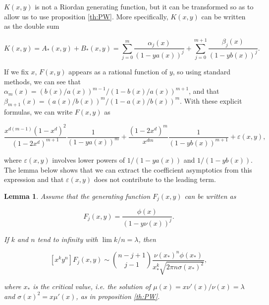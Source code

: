 \documentclass{article}
\newtheorem{lemma}{Lemma}
\begin{document}
$K(x,y)$ is not a Riordan generating function, but it can be transformed
so as to allow us to use proposition \ref{th:PW}. More specifically,
$K(x,y)$ can be written as the double sum

\begin{equation}
\label{eq:mcontigs}
K(x,y) = A_*(x,y) + B_*(x,y) =
\sum_{j=0}^m\frac{\alpha_j(x)}{\left(1-ya(x)\right)^j}
+ \sum_{j=0}^{m+1}\frac{\beta_j(x)}{\left(1-yb(x)\right)^j}.
\end{equation}

If we fix $x$, $F(x,y)$ appears as a rational function of $y$, so using
standard methods, we can see that $\alpha_m(x) = (b(x)/a(x))^{m-1} /
(1-b(x)/a(x))^{m+1}$, and that $\beta_{m+1}(x) = (a(x)/b(x))^m /
(1-a(x)/b(x))^m$. With these explicit formulas, we can write $F(x,y)$ as

\begin{equation}
\label{eq:mcontigs_epsilon}
\frac{x^{d(m-1)}(1-x^d)^2}{(1-2x^d)^{m+1}}
  \frac{1}{\left(1-ya(x)\right)^m} + 
\frac{(1-2x^d)^m}{x^{dm}}
  \frac{1}{\left(1-yb(x)\right)^{m+1}} + \varepsilon(x,y),
\end{equation}

\noindent
where $\varepsilon(x,y)$ involves lower powers of $1 / (1-ya(x))$ and
$1 / (1-yb(x))$. The lemma below shows that we can extract the coefficient
asymptotics from this expression and that $\varepsilon(x,y)$ does not
contribute to the leading term.

\begin{lemma}
\label{lem:RAasspow}
Assume that the generating function $F_j(x,y)$ can be written as

\begin{equation*}
F_j(x,y) =
\frac{\phi(x)}{(1-y\nu(x))^j}.
\end{equation*}

If $k$ and $n$ tend to infinity with $\lim k/n = \lambda$, then

\begin{equation}
\label{eq:RAasspow}
[x^ky^n]F_j(x,y) \sim {n-j+1 \choose j-1}
\frac{\nu(x_*)^n \phi(x_*)}
{x_*^k\sqrt{2\pi n \sigma(x_*)^2}},
\end{equation}

\noindent
where $x_*$ is the critical value, \textit{i.e.} the solution of
$\mu(x) = x\nu'(x)/\nu(x) = \lambda$ and $\sigma(x)^2 = x \mu'(x)$,
as in proposition \ref{th:PW}.
\end{lemma}
\end{document}
